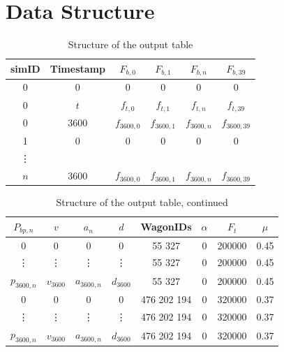 \section{Data Structure}
\label{sec:DataStructure}

\bigskip
\begin{table}[htb!]
	\centering
	\begin{tabular}{*{6}{c}}\toprule
		simID & Timestamp & $F_{b,0}$ & $F_{b,1}$ & $F_{b,n}$ & $F_{b,39}$ \\ \midrule
		0 & 0 & 0 & 0 & 0 & 0 \\
		0 & $t$ & $f_{t,0}$ & $f_{t,1}$ & $f_{t,n}$ & $f_{t,39}$ \\
		0 & 3600 & $f_{3600,0}$ & $f_{3600,1}$ & $f_{3600,n}$ & $f_{3600,39}$ \\
		1 & 0 & 0 & 0 & 0 & 0 \\
		\vdots & & & & & \\
		$n$ & 3600 & $f_{3600,0}$ & $f_{3600,1}$ & $f_{3600,n}$ & $f_{3600,39}$ \\
	\end{tabular}
	\caption{Structure of the output table}
	\label{tab:datastructure}
\end{table}
\bigskip

\bigskip
\begin{table}[htb!]
	\centering
	\begin{tabular}{*{8}{c}}\toprule
		$P_{bp,n}$ & $v$ & $a_{n}$ & $d$ & WagonIDs & $\alpha$ & $F_{t}$ & $\mu$ \\ \midrule
		0 & 0 & 0 & 0 & 55 327 & 0 & 200000 & 0.45 \\
		\vdots & \vdots & \vdots & \vdots & 55 327 & 0 & 200000 & 0.45 \\
		$p_{3600,n}$ & $v_{3600}$ & $a_{3600,n}$ & $d_{3600}$ & 55 327 & 0 & 200000 & 0.45 \\
		0 & 0 & 0 & 0 & 476 202 194 & 0 & 320000 & 0.37 \\
		\vdots & \vdots & \vdots & \vdots & 476 202 194 & 0 & 320000 & 0.37 \\
		$p_{3600,n}$ & $v_{3600}$ & $a_{3600,n}$ & $d_{3600}$ & 476 202 194 & 0 & 320000 & 0.37
	\end{tabular}
	\caption{Structure of the output table, continued}
	\label{tab:datastructure2}
\end{table}
\bigskip


